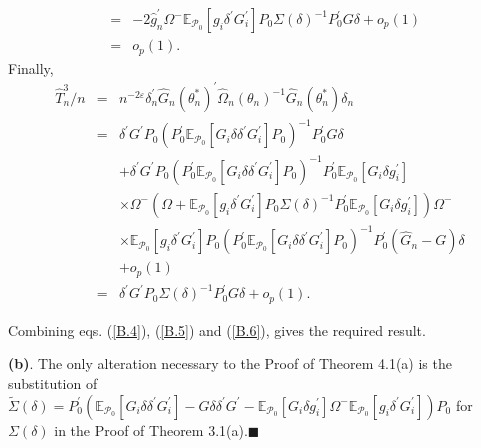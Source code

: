 \documentclass[hidelinks, 11 pt, a4paper, pdflatex]{article}
\begin{document}
{\begin{eqnarray}
                       & = & - 2\hat{g}_{n}^{\prime}\Omega^{-}\mathbb{E}_{\mathcal{P}_{0}}[g_{i}\delta^{\prime}G_{i}^{\prime}]
                                P_{0}\Sigma(\delta)^{-1}P_{0}^{\prime}G\delta + o_{p}(1)  \nonumber \\
                       & = & o_{p}(1).  \label{B.5}
    \end{eqnarray}%
   Finally,
    \begin{eqnarray}
     \hat{T}_{n}^{3}/n & = & n^{-2\varepsilon}
                              \delta_{n}^{\prime}\hat{G}_{n}(\theta_{n}^{\ast})^{\prime}\hat{\Omega}_{n}(\theta_{n})^{-1}\hat{G}_{n}(\theta_{n}^{\ast })\delta _{n}  \nonumber \\
                       & = & \delta^{\prime}G^{\prime}P_{0}
                              (P_{0}^{\prime}\mathbb{E}_{\mathcal{P}_{0}}[G_{i}\delta \delta^{\prime}G_{i}^{\prime}]P_{0})^{-1}
                               P_{0}^{\prime}G\delta  \nonumber \\
                       &   & + \delta^{\prime }G^{\prime}P_{0}
                                (P_{0}^{\prime}\mathbb{E}_{\mathcal{P}_{0}}[G_{i}\delta \delta^{\prime}G_{i}^{\prime}]P_{0})^{-1}
                                 P_{0}^{\prime}\mathbb{E}_{\mathcal{P}_{0}}[G_{i}\delta g_{i}^{\prime }] \nonumber \\
                       &   & \times \Omega^{-}
                                 (\Omega + \mathbb{E}_{\mathcal{P}_{0}}[g_{i}\delta^{\prime}G_{i}^{\prime}]
                                  P_{0}\Sigma(\delta)^{-1}P_{0}^{\prime}
                                  \mathbb{E}_{\mathcal{P}_{0}}[G_{i}\delta g_{i}^{\prime}])
                                 \Omega ^{-}  \nonumber \\
                       &   & \times \mathbb{E}_{\mathcal{P}_{0}}[g_{i}\delta^{\prime}G_{i}^{\prime}]P_{0}
                                 (P_{0}^{\prime}\mathbb{E}_{\mathcal{P}_{0}}[G_{i}\delta \delta^{\prime}G_{i}^{\prime}]P_{0})^{-1}
                                  P_{0}^{\prime}(\hat{G}_{n} - G)\delta  \nonumber \\
                       &   & + o_{p}(1)  \nonumber \\
                       & = & \delta^{\prime}G^{\prime}P_{0}\Sigma(\delta)^{-1}P_{0}^{\prime}G\delta + o_{p}(1).  \label{B.6}
    \end{eqnarray}

   Combining eqs. (\ref{B.4}), (\ref{B.5}) and (\ref{B.6}), gives the required result.

   \textbf{(b)}. The only alteration necessary to the Proof of Theorem 4.1(a) is the substitution of $\tilde{\Sigma}(\delta) = 
    P_{0}^{\prime}(\mathbb{E}_{\mathcal{P}_{0}}[G_{i}\delta \delta^{\prime}G_{i}^{\prime}] - G\delta \delta^{\prime}G^{\prime} - \mathbb{E}_{\mathcal{P}_{0}}[G_{i}\delta g_{i}^{\prime}]\Omega^{-}\mathbb{E}_{\mathcal{P}_{0}}[g_{i}\delta^{\prime}G_{i}^{\prime}])P_{0}$ for $\Sigma(\delta)$ in the Proof of Theorem 3.1(a).$\blacksquare$ \\

}
\end{document}
